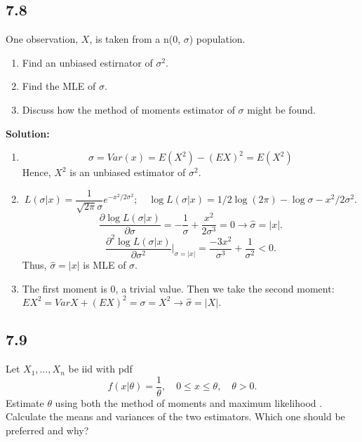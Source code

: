 \documentclass[11pt]{article}
\newcommand{\Sol}{\par {\bf Solution:}}
\newcommand{\sample}[1]{#1_1 , \dots , #1_n}
\begin{document}
\subsection*{7.8}
One observation, $X$, is taken from a n(0, $\sigma$) population.
\begin{enumerate}[label=(\alph*)]
    \item Find an unbiased estirnator of $\sigma^2$.
    \item Find the MLE of $\sigma$.
    \item Discuss how the method of moments estimator of $\sigma$ might be found.
\end{enumerate}

\Sol
\begin{enumerate}[label=(\alph*)]
    \item
    \[
    \sigma = Var(x) = E(X^2) - (EX)^2 = E(X^2)
    \]
    Hence, $X^2$ is an unbiased estimator of $\sigma^2$.
    \item
    \[
    L(\sigma |x) = \frac{1}{\sqrt{2\pi}\sigma} e^{-x^2/2\sigma^2};\quad
    \log L(\sigma |x) = 1/2\log(2\pi) - \log\sigma - x^2/2\sigma^2.
    \]
    \[
    \frac{\partial \log L(\sigma |x)}{\partial \sigma} = -\frac{1}{\sigma} + \frac{x^2}{2\sigma^3} = 0 \to \hat \sigma = |x|.
    \]
    \[
    \frac{\partial^2 \log L(\sigma |x)}{\partial \sigma^2}|_{\sigma = |x|} = \frac{-3x^2}{\sigma^3} + \frac{1}{\sigma^2} < 0.
    \]
    Thus, $\hat \sigma = |x|$ is MLE of $\sigma$.
    
    \item
    The first moment is 0, a trivial value. Then we take the second moment: $E X^2 = VarX + (EX)^2 = \sigma = X^2 \to \hat \sigma = |X|.$ 
\end{enumerate}

\subsection*{7.9}
Let $\sample{X}$ be iid with pdf
\[
f(x|\theta) = \frac{1}{\theta}, \quad 0 \le x \le \theta, \quad \theta > 0.
\]
Estimate $\theta$ using both the method of moments and maximum likelihood . Calculate the means and variances of the two estimators. Which one should be preferred and why?
\end{document}
